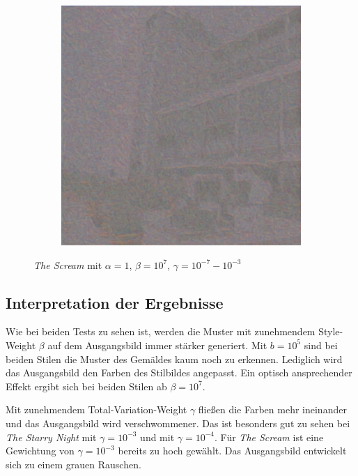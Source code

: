 \begin{figure}[H]
\begin{subfigure}[h]{0.15\textwidth}
    \end{subfigure}
    \begin{subfigure}[h]{0.15\textwidth}
        \centering
        \includegraphics[width=\textwidth]{resources/content/experiments/b__the_scream__768x768__style-weight_1e+07__tv-weight_1e-03.jpg}
    \end{subfigure}
    \caption{\textit{The Scream} mit $ \alpha = 1 $, $ \beta = 10^{7} $, $ \gamma = 10^{-7} - 10^{-3} $}
\end{figure}

\pagebreak

\subsection{Interpretation der Ergebnisse}

Wie bei beiden Tests zu sehen ist, werden die Muster mit zunehmendem Style-Weight $ \beta $ auf dem Ausgangsbild immer stärker generiert. Mit $ b = 10^{5} $ sind bei beiden Stilen die Muster des Gemäldes kaum noch zu erkennen. Lediglich wird das Ausgangsbild den Farben des Stilbildes angepasst. Ein optisch ansprechender Effekt ergibt sich bei beiden Stilen ab $ \beta = 10^{7} $. 

Mit zunehmendem Total-Variation-Weight $ \gamma $ fließen die Farben mehr ineinander und das Ausgangsbild wird verschwommener. Das ist besonders gut zu sehen bei \textit{The Starry Night} mit $ \gamma = 10^{-3} $ und  mit $ \gamma = 10^{-4} $. Für \textit{The Scream} ist eine Gewichtung von $ \gamma = 10^{-3} $ bereits zu hoch gewählt. Das Ausgangsbild entwickelt sich zu einem grauen Rauschen.


